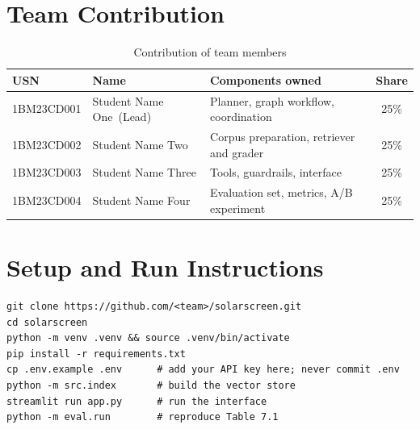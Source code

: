 \documentclass[12pt,a4paper,oneside]{report}
\newcommand{\USNa}{1BM23CD001}  \newcommand{\NameA}{Student Name One}
\newcommand{\USNb}{1BM23CD002}  \newcommand{\NameB}{Student Name Two}
\newcommand{\USNc}{1BM23CD003}  \newcommand{\NameC}{Student Name Three}
\newcommand{\USNd}{1BM23CD004}  \newcommand{\NameD}{Student Name Four}
\newif\ifguidance
\newcommand{\guide}[1]{%
  \ifguidance
  \begin{tcolorbox}[enhanced,breakable,colback=guidebg,colframe=bmsblue,
    boxrule=0.6pt,arc=2pt,left=6pt,right=6pt,top=4pt,bottom=4pt,
    fonttitle=\bfseries\small,title={What to write here},
    before upper={\small\setstretch{1.1}}]
  #1
  \end{tcolorbox}
  \fi}
\newcommand{\dodont}[2]{%
  \ifguidance
  \begin{tcolorbox}[enhanced,breakable,sidebyside,sidebyside align=top seam,
    colback=dobg,colbacklower=dontbg,colframe=gray!60,boxrule=0.5pt,arc=2pt,
    lefthand ratio=0.5,left=5pt,right=5pt,top=4pt,bottom=4pt,
    fontupper=\small\setstretch{1.05},fontlower=\small\setstretch{1.05}]
  \textbf{\textcolor{ForestGreen}{\checkmark\ Do}}
  \begin{itemize}[leftmargin=12pt,itemsep=1pt,topsep=2pt]#1\end{itemize}
  \tcblower
  \textbf{\textcolor{BrickRed}{$\times$ Don't}}
  \begin{itemize}[leftmargin=12pt,itemsep=1pt,topsep=2pt]#2\end{itemize}
  \end{tcolorbox}
  \fi}
\newenvironment{sample}
  {\par\noindent{\footnotesize\bfseries\textcolor{BrickRed}{[SAMPLE --- replace with your own content]}}\par\color{samplecol}}
  {\par\medskip}
\begin{document}
\appendix
\chapter{Team Contribution}
\label{app:contrib}
\guide{Required by the guidelines. State who owned which component. Contributions should be
reasonably balanced, and every member must be able to explain the whole system.}
\dodont{\item Be specific about each person's components.
}
{\item Do not list everyone as having done ``everything''.
}

\begin{sample}
\begin{table}[H]
\centering
\caption{Contribution of team members}
\small
\begin{tabularx}{\linewidth}{@{}l l X c@{}}
\toprule
\textbf{USN} & \textbf{Name} & \textbf{Components owned} & \textbf{Share} \\ \midrule
\USNa & \NameA\ (Lead) & Planner, graph workflow, coordination & 25\% \\
\USNb & \NameB & Corpus preparation, retriever and grader & 25\% \\
\USNc & \NameC & Tools, guardrails, interface & 25\% \\
\USNd & \NameD & Evaluation set, metrics, A/B experiment & 25\% \\
\bottomrule
\end{tabularx}
\end{table}
\end{sample}

\chapter{Setup and Run Instructions}
\label{app:run}
\guide{Repository link, environment setup, how to configure API keys (never print real keys), how to
run the agent, and how to reproduce the evaluation. Match the README in your repository.}
\begin{sample}
\begin{lstlisting}[language={},numbers=none]
git clone https://github.com/<team>/solarscreen.git
cd solarscreen
python -m venv .venv && source .venv/bin/activate
pip install -r requirements.txt
cp .env.example .env      # add your API key here; never commit .env
python -m src.index       # build the vector store
streamlit run app.py      # run the interface
python -m eval.run        # reproduce Table 7.1
\end{lstlisting}
\end{sample}
\end{document}
